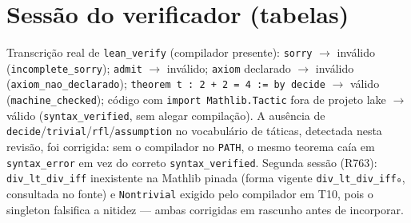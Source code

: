 \chapter{Sessão do verificador (tabelas)}
\label{ap:sessao}
Transcrição real de \texttt{lean\_verify} (compilador presente): \texttt{sorry} $\to$ inválido (\texttt{incomplete\_sorry}); \texttt{admit} $\to$ inválido; \texttt{axiom} declarado $\to$ inválido (\texttt{axiom\_nao\_declarado}); \texttt{theorem t : 2 + 2 = 4 := by decide} $\to$ válido (\texttt{machine\_checked}); código com \texttt{import Mathlib.Tactic} fora de projeto lake $\to$ válido (\texttt{syntax\_verified}, sem alegar compilação). A ausência de \texttt{decide}/\texttt{trivial}/\texttt{rfl}/\texttt{assumption} no vocabulário de táticas, detectada nesta revisão, foi corrigida: sem o compilador no \texttt{PATH}, o mesmo teorema caía em \texttt{syntax\_error} em vez do correto \texttt{syntax\_verified}. Segunda sessão (R763): \texttt{div\_lt\_div\_iff} inexistente na Mathlib pinada (forma vigente \texttt{div\_lt\_div\_iff₀}, consultada no fonte) e \texttt{Nontrivial} exigido pelo compilador em T10, pois o singleton falsifica a nitidez --- ambas corrigidas em rascunho antes de incorporar.
